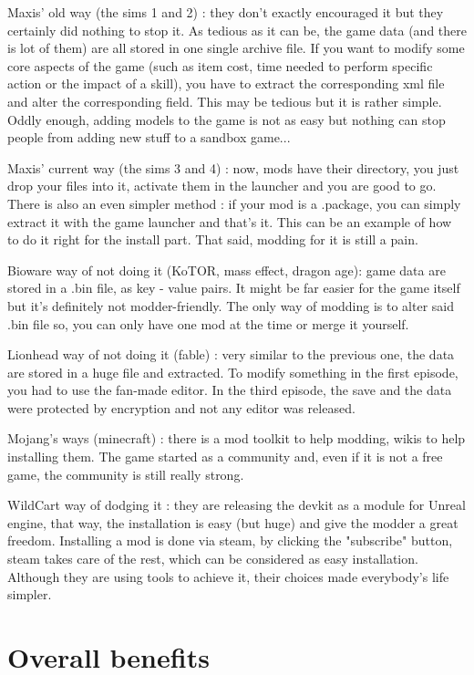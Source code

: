 \documentclass[a4paper,12pt]{article}
\begin{document}
Maxis' old way (the sims 1 and 2) : they don't exactly encouraged it but they certainly did nothing to stop it. As tedious as it can be, the game data (and there is lot of them) are all stored in one single archive file. If you want to modify some core aspects of the game (such as item cost, time needed to perform specific action or the impact of a skill), you have to extract the corresponding xml file and alter the corresponding field. This may be tedious but it is rather simple. Oddly enough, adding models to the game is not as easy but nothing can stop people from adding new stuff to a sandbox game...

Maxis' current way (the sims 3 and 4) : now, mods have their directory, you just drop your files into it, activate them in the launcher and you are good to go. There is also an even simpler method : if your mod is a .package, you can simply extract it with the game launcher and that's it. This can be an example of how to do it right for the install part. That said, modding for it is still a pain.

Bioware way of not doing it (KoTOR, mass effect, dragon age): game data are stored in a .bin file, as key - value pairs. It might be far easier for the game itself but it's definitely not modder-friendly. The only way of modding is to alter said .bin file so, you can only have one mod at the time or merge it yourself.

Lionhead way of not doing it (fable) : very similar to the previous one, the data are stored in a huge file and extracted. To modify something in the first episode, you had to use the fan-made editor. In the third episode, the save and the data were protected by encryption and not any editor was released.

Mojang's ways (minecraft) : there is a mod toolkit to help modding, wikis to help installing them. The game started as a community and, even if it is not a free game, the community is still really strong.

WildCart way of dodging it : they are releasing the devkit as a module for Unreal engine, that way, the installation is easy (but huge) and give the modder a great freedom. Installing a mod is done via steam, by clicking the "subscribe" button, steam takes care of the rest, which can be considered as easy installation. Although they are using tools to achieve it, their choices made everybody's life simpler.

\newpage
\section{Overall benefits}
\end{document}

